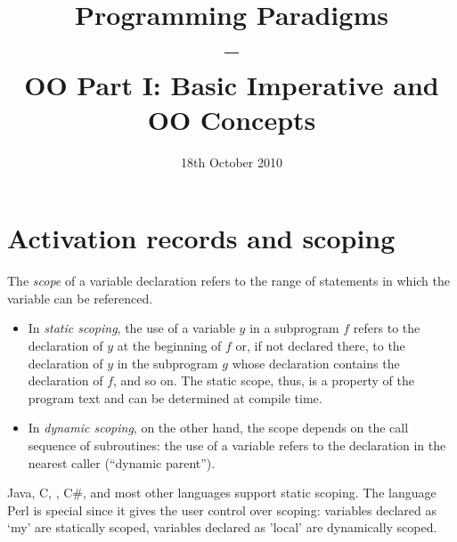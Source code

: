 \documentclass{article}
\title{Programming Paradigms\\--\\OO Part I: Basic Imperative and OO Concepts}
\date{18th October 2010}
\begin{document}
\maketitle


\section{Activation records and scoping}
The \textit{scope} of a variable declaration refers to the range of
statements in which the variable can be referenced. 
\begin{itemize}
\item In \textit{static scoping}, the use of a variable $y$ in
a subprogram $f$ refers to the declaration of $y$ at the beginning of $f$ 
or, if not
declared there, to the declaration of $y$ in the subprogram $g$ 
whose declaration
contains the declaration of $f$, and so on. The static scope, thus,
is a property of the program text and can be determined at compile time.
\item In \textit{dynamic scoping}, on the other hand, 
the scope depends on the call sequence of
subroutines: the use of a variable refers to the declaration in 
the nearest caller (``dynamic parent'').
\end{itemize}
Java, C, \Cpp, C\#, and most other
 languages support static scoping. The language Perl is special
since it gives the user control over  scoping: 
variables declared as \textsf{`my'} are statically scoped, 
variables declared as \textsf{'local'} are dynamically scoped.  

\end{document}
